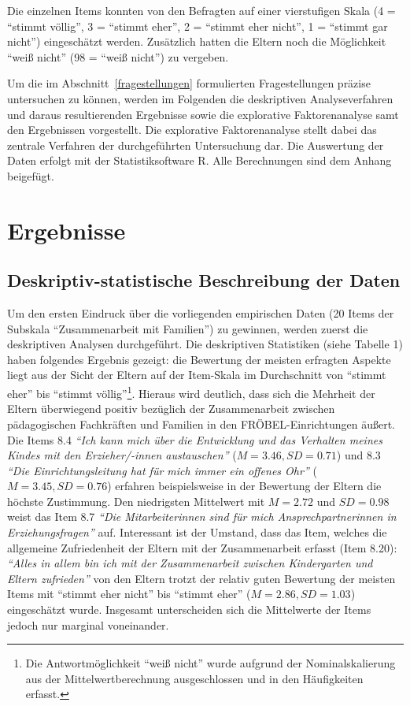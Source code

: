 \documentclass[12pt,a4paper]{article}
\begin{document}
	Die einzelnen Items konnten von den Befragten auf einer vierstufigen Skala (4 = "`stimmt völlig"', 3 = "`stimmt eher"', 2 = "`stimmt eher nicht"', 1 = "`stimmt gar nicht"') eingeschätzt werden. Zusätzlich hatten die Eltern noch die Möglichkeit "`weiß nicht"' (98 = "`weiß nicht"') zu vergeben.
	   
	Um die im Abschnitt~\ref{fragestellungen} formulierten Fragestellungen präzise untersuchen zu können, werden im Folgenden die deskriptiven Analyseverfahren und daraus resultierenden Ergebnisse sowie die explorative Faktorenanalyse samt den Ergebnissen vorgestellt. Die explorative Faktorenanalyse stellt dabei das zentrale Verfahren der durchgeführten Untersuchung dar. Die Auswertung der Daten erfolgt mit der Statistiksoftware R. Alle Berechnungen sind dem Anhang beigefügt.
\pagebreak
\section{Ergebnisse}  
\subsection{Deskriptiv-statistische Beschreibung der Daten}

Um den ersten Eindruck über die vorliegenden empirischen Daten (20 Items der Subskala "`Zusammenarbeit mit Familien"') zu gewinnen, werden zuerst die deskriptiven Analysen durchgeführt. Die deskriptiven Statistiken (siehe Tabelle 1) haben folgendes Ergebnis gezeigt: die Bewertung der meisten erfragten Aspekte liegt aus der Sicht der Eltern auf der Item-Skala im Durchschnitt von "`stimmt eher"' bis "`stimmt völlig"'\footnote{Die Antwortmöglichkeit "`weiß nicht"' wurde aufgrund der Nominalskalierung aus der Mittelwertberechnung ausgeschlossen und in den Häufigkeiten erfasst.}. Hieraus wird deutlich, dass sich die Mehrheit der Eltern überwiegend positiv bezüglich der Zusammenarbeit zwischen pädagogischen Fachkräften und Familien in den FRÖBEL-Einrichtungen äußert. Die Items 8.4 \textit{"`Ich kann mich über die Entwicklung und das Verhalten meines Kindes mit den Erzieher/-innen austauschen"'} ($M = 3.46, SD = 0.71$) und 8.3 \textit{"`Die Einrichtungsleitung hat für mich immer ein offenes Ohr"'} ($M = 3.45, SD = 0.76$) erfahren beispielsweise in der Bewertung der Eltern die höchste Zustimmung. Den niedrigsten Mittelwert mit $M = 2.72$ und $SD = 0.98$ weist das Item 8.7 \textit{"`Die Mitarbeiterinnen sind für mich Ansprechpartnerinnen in Erziehungsfragen"'} auf. Interessant ist der Umstand, dass das Item, welches die allgemeine Zufriedenheit der Eltern mit der Zusammenarbeit erfasst (Item 8.20): \textit{"`Alles in allem bin ich mit der Zusammenarbeit zwischen Kindergarten und Eltern zufrieden"'} von den Eltern trotzt der relativ guten Bewertung der meisten Items mit "`stimmt eher nicht"' bis "`stimmt eher"' ($M = 2.86, SD = 1.03$) eingeschätzt wurde. Insgesamt unterscheiden sich die Mittelwerte der Items jedoch nur marginal voneinander.
\end{document}
